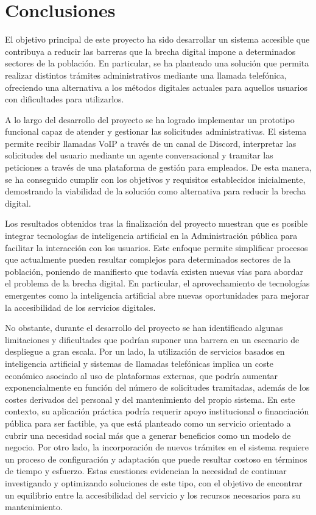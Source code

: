 \section{Conclusiones}

    El objetivo principal de este proyecto ha sido desarrollar un sistema accesible que contribuya a reducir las barreras que la brecha digital impone a determinados sectores de la población. 
    En particular, se ha planteado una solución que permita realizar distintos trámites administrativos mediante una llamada telefónica, ofreciendo una alternativa a los métodos digitales actuales para aquellos usuarios con dificultades para utilizarlos. 

    A lo largo del desarrollo del proyecto se ha logrado implementar un prototipo funcional capaz de atender y gestionar las solicitudes administrativas. 
    El sistema permite recibir llamadas VoIP a través de un canal de Discord, interpretar las solicitudes del usuario mediante un agente conversacional y tramitar las peticiones a través de una plataforma de gestión para empleados. 
    De esta manera, se ha conseguido cumplir con los objetivos y requisitos establecidos inicialmente, demostrando la viabilidad de la solución como alternativa para reducir la brecha digital. 

    Los resultados obtenidos tras la finalización del proyecto muestran que es posible integrar tecnologías de inteligencia artificial en la Administración pública para facilitar la interacción con los usuarios. 
    Este enfoque permite simplificar procesos que actualmente pueden resultar complejos para determinados sectores de la población, poniendo de manifiesto que todavía existen nuevas vías para abordar el problema de la brecha digital. 
    En particular, el aprovechamiento de tecnologías emergentes como la inteligencia artificial abre nuevas oportunidades para mejorar la accesibilidad de los servicios digitales.

    No obstante, durante el desarrollo del proyecto se han identificado algunas limitaciones y dificultades que podrían suponer una barrera en un escenario de despliegue a gran escala. 
    Por un lado, la utilización de servicios basados en inteligencia artificial y sistemas de llamadas telefónicas implica un coste económico asociado al uso de plataformas externas, que podría aumentar exponencialmente en función del número de solicitudes tramitadas, además de los costes derivados del personal y del mantenimiento del propio sistema. 
    En este contexto, su aplicación práctica podría requerir apoyo institucional o financiación pública para ser factible, ya que está planteado como un servicio orientado a cubrir una necesidad social más que a generar beneficios como un modelo de negocio. 
    Por otro lado, la incorporación de nuevos trámites en el sistema requiere un proceso de configuración y adaptación que puede resultar costoso en términos de tiempo y esfuerzo.
    Estas cuestiones evidencian la necesidad de continuar investigando y optimizando soluciones de este tipo, con el objetivo de encontrar un equilibrio entre la accesibilidad del servicio y los recursos necesarios para su mantenimiento. 

